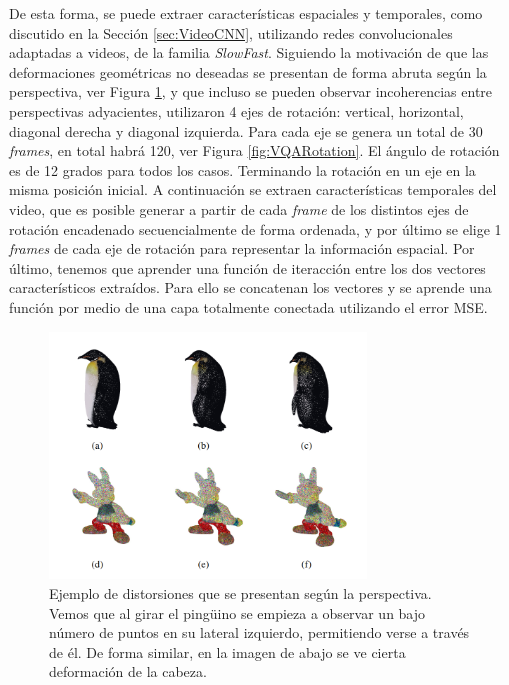 De esta forma, se puede extraer características espaciales y temporales, como 
discutido en la Sección \ref{sec:VideoCNN}, utilizando redes convolucionales 
adaptadas a videos, de la familia \emph{SlowFast}\cite{SlowFastNetworks}.
Siguiendo la motivación de que las deformaciones geométricas no deseadas se presentan 
de forma abruta según la perspectiva, ver Figura \ref{fig:ViewPoint}, y que 
incluso se pueden observar incoherencias entre perspectivas adyacientes, 
utilizaron 4 ejes de rotación: vertical, horizontal, diagonal derecha 
y diagonal izquierda. Para cada eje se genera un total de 30 \emph{frames}, 
en total habrá 120, ver Figura \ref{fig:VQARotation}. El ángulo de rotación es de 12 grados para todos los casos. 
Terminando la rotación en un eje en la misma posición inicial. 
A continuación se extraen características temporales del video, que es posible 
generar a partir de cada \emph{frame} de los distintos ejes de rotación encadenado
secuencialmente de forma ordenada, y por último se elige 1 \emph{frames} de cada 
eje de rotación para representar la información espacial. Por último, 
tenemos que aprender una función de iteracción entre los dos vectores característicos 
extraídos. Para ello se concatenan los vectores y se aprende una función por 
medio de una capa totalmente conectada utilizando el error MSE.

\begin{figure}
  \begin{center}
    \includegraphics[width=0.75\textwidth]{imagenes/chapter4/ViewPoint}
  \end{center}
  \caption[Ejemplo de distorsiones que se presentan según la perspectiva]{
  Ejemplo de distorsiones que se presentan según la perspectiva.
Vemos que al girar el pingüino se empieza a observar un bajo número de puntos en su 
lateral izquierdo, permitiendo verse a través de él. De forma similar, 
en la imagen de abajo se ve cierta deformación de la cabeza.}
  \label{fig:ViewPoint}
\end{figure}

